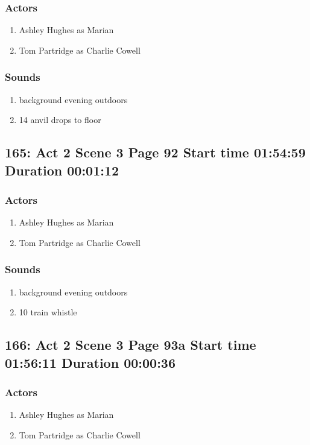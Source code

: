 \subsubsection{Actors}
\begin{enumerate}
\item Ashley Hughes as Marian
\item Tom Partridge as Charlie Cowell
\end{enumerate}

\subsubsection{Sounds}
\begin{enumerate}
\item background evening outdoors
\item 14 anvil drops to floor
\end{enumerate}
\subsection{165: Act 2 Scene 3 Page 92 Start time 01:54:59 Duration 00:01:12}

\subsubsection{Actors}
\begin{enumerate}
\item Ashley Hughes as Marian
\item Tom Partridge as Charlie Cowell
\end{enumerate}

\subsubsection{Sounds}
\begin{enumerate}
\item background evening outdoors
\item 10 train whistle
\end{enumerate}
\subsection{166: Act 2 Scene 3 Page 93a Start time 01:56:11 Duration 00:00:36}

\subsubsection{Actors}
\begin{enumerate}
\item Ashley Hughes as Marian
\item Tom Partridge as Charlie Cowell
\end{enumerate}

